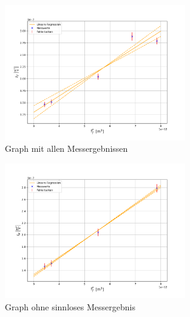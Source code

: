 \documentclass[11pt,a4paper]{article}
\begin{document}
\begin{figure}[h]
\centering
\includegraphics[width=0.7\textwidth]{graph_with_5}
\renewcommand\thefigure{B2}\vspace{-22pt}
\caption[Graph mit allen Messergebnissen]{Graph mit allen Messergebnissen}
\label{Abb:1}
\end{figure}

\begin{figure}[h]
\centering
\includegraphics[width=0.7\textwidth]{graph_without_5}
\renewcommand\thefigure{B3}\vspace{-22pt}
\caption[Graph ohne sinnloses Messergebnis]{Graph ohne sinnloses Messergebnis}
\label{Abb:2}
\end{figure}
\end{document}
